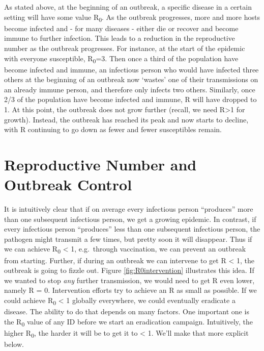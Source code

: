 \documentclass[]{book}
\theoremstyle{definition}
\theoremstyle{definition}
\theoremstyle{definition}
\theoremstyle{remark}
\begin{document}
As stated above, at the beginning of an outbreak, a specific disease in
a certain setting will have some value R\textsubscript{0}. As the
outbreak progresses, more and more hosts become infected and - for many
diseases - either die or recover and become immune to further infection.
This leads to a reduction in the reproductive number as the outbreak
progresses. For instance, at the start of the epidemic with everyone
susceptible, R\textsubscript{0}=3. Then once a third of the population
have become infected and immune, an infectious person who would have
infected three others at the beginning of an outbreak now `wastes' one
of their transmissions on an already immune person, and therefore only
infects two others. Similarly, once 2/3 of the population have become
infected and immune, R will have dropped to 1. At this point, the
outbreak does not grow further (recall, we need R\textgreater{}1 for
growth). Instead, the outbreak has reached its peak and now starts to
decline, with R continuing to go down as fewer and fewer susceptibles
remain.

\hypertarget{reproductive-number-and-outbreak-control}{%
\section{Reproductive Number and Outbreak
Control}\label{reproductive-number-and-outbreak-control}}

It is intuitively clear that if on average every infectious person
``produces'' more than one subsequent infectious person, we get a
growing epidemic. In contrast, if every infectious person ``produces''
less than one subsequent infectious person, the pathogen might transmit
a few times, but pretty soon it will disappear. Thus if we can achieve
R\textsubscript{0} \textless{} 1, e.g.~through vaccination, we can
prevent an outbreak from starting. Further, if during an outbreak we can
intervene to get R \textless{} 1, the outbreak is going to fizzle out.
Figure \ref{fig:R0intervention} illustrates this idea. If we wanted to
stop \emph{any} further transmission, we would need to get R even lower,
namely R = 0. Intervention efforts try to achieve an R as small as
possible. If we could achieve R\textsubscript{0} \textless{} 1 globally
everywhere, we could eventually eradicate a disease. The ability to do
that depends on many factors. One important one is the
R\textsubscript{0} value of any ID before we start an eradication
campaign. Intuitively, the higher R\textsubscript{0}, the harder it will
be to get it to \textless{} 1. We'll make that more explicit below.
\end{document}
